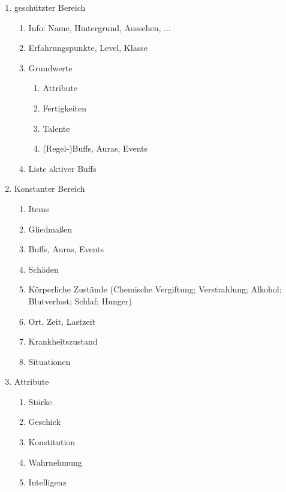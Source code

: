 \documentclass{article}
\begin{document}
\begin{enumerate}
\item geschützter Bereich
\begin{enumerate}
\item Info: Name, Hintergrund, Aussehen, ...
\item Erfahrungspunkte, Level, Klasse

\item Grundwerte
\begin{enumerate}
\item Attribute
\item Fertigkeiten
\item Talente
\item (Regel-)Buffs, Auras, Events
\end{enumerate}

\item Liste aktiver Buffs
\end{enumerate}

\item Konstanter Bereich
\begin{enumerate}
\item Items
\item Gliedmaßen
\item Buffs, Auras, Events
\item Schäden
\item Körperliche Zustände (Chemische Vergiftung; Verstrahlung; Alkohol; Blutverlust; Schlaf; Hunger)
\item Ort, Zeit, Lastzeit
\item Krankheitszustand
\item Situationen
\end{enumerate}

\item Attribute
\begin{enumerate}
\item Stärke
\item Geschick
\item Konstitution
\item Wahrnehmung
\item Intelligenz
\end{enumerate}

\end{enumerate}
\end{document}
